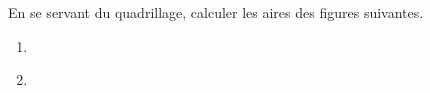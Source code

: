
\begin{exercice}\label{exo2smath-0268}

    En se servant du quadrillage, calculer les aires des figures suivantes.
    \begin{multicols}{2}
    \begin{enumerate}
        \item

    \begin{center}
        
    \end{center}

\item

\begin{center}
   
\end{center}

    \end{enumerate}
    \end{multicols}

\end{exercice}
